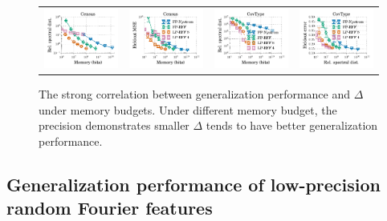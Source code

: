 \begin{figure}
	\centering
	\begin{tabular}{c c c c}
		\includegraphics[width=0.24\linewidth]{figures/regression_delta_vs_mem.pdf} &
		\includegraphics[width=0.24\linewidth]{figures/regression_l2_vs_mem.pdf} &
		\includegraphics[width=0.24\linewidth]{figures/classification_delta_vs_mem.pdf} &
		\includegraphics[width=0.24\linewidth]{figures/classification_acc_vs_mem.pdf} 
	\end{tabular}
	\caption{The strong correlation between generalization performance and $\Delta$ under memory budgets. Under different memory budget, the precision demonstrates smaller $\Delta$ tends to have better generalization performance.}
	\label{fig:generalizatio_col}
\end{figure}


\subsection{Generalization performance of low-precision random Fourier features}